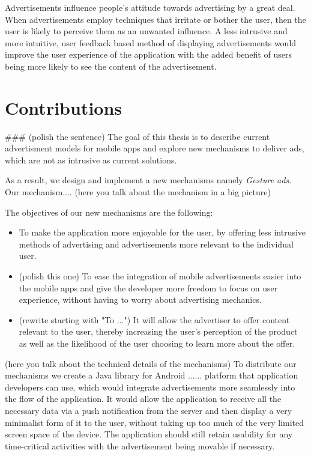 Advertisements influence people's attitude towards advertising by a great deal. When advertisements employ techniques that irritate or bother the user, then the user is likely to perceive them as an unwanted influence.\cite{chowdhury2010consumer} A less intrusive and more intuitive, user feedback based method of displaying advertisements would improve the user experience of the application with the added benefit of users being more likely to see the content of the advertisement.

\section{Contributions}
### (polish the sentence) The goal of this thesis is to describe current advertisment models for mobile apps and explore new mechanisms to deliver ads, which are not as intrusive as current solutions.


As a result, we design and implement a new mechanisms namely \textit{Gesture ads}. Our mechanism.... (here you talk about the mechanism in a big picture)


The objectives of our new mechanisms are the following:
\begin{itemize}
  \item To make the application more enjoyable for the user, by offering less intrusive methods of advertising and advertisements more relevant to the individual user.
  \item (polish this one) To ease the integration of mobile advertisements easier into the mobile apps and give the developer more freedom to focus on user experience, without having to worry about advertising mechanics.
  \item (rewrite starting with "To ...") It will allow the advertiser to offer content relevant to the user, thereby increasing the user's perception of the product as well as the likelihood of the user choosing to learn more about the offer.
\end{itemize}



(here you talk about the technical details of the mechanisms) To distribute our mechanisms we create a Java library for Android \cite{android:platform} ...... platform that application developers can use, which would integrate advertisements more seamlessly into the flow of the application. It would allow the application to receive all the necessary data via a push notification from the server and then display a very minimalist form of it to the user, without taking up too much of the very limited screen space of the device. The application should still retain usability for any time-critical activities with the advertisement being movable if necessary.


